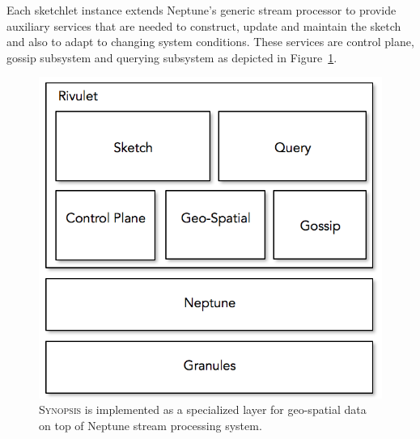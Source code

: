 Each sketchlet instance extends Neptune's generic stream processor to provide auxiliary services that are needed to construct, update and maintain the sketch and also to adapt to changing system conditions.
These services are control plane, gossip subsystem and querying subsystem as depicted in Figure~\ref{fig:rivulet-archi}.
%
\begin{figure}
    \centerline{\includegraphics[scale=0.5]{figures/rivulet-archi.png}}
    \caption{\textsc{Synopsis} is implemented as a specialized layer for geo-spatial data on top of Neptune stream processing system.}
    \label{fig:rivulet-archi}
\end{figure}
%
